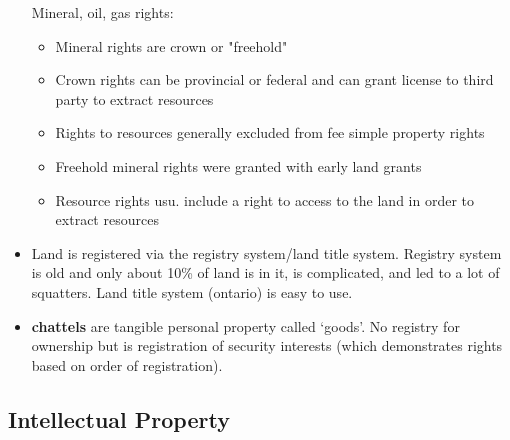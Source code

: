 \documentclass[10pt]{article}
\begin{document}
\begin{itemize}
		Mineral, oil, gas rights:
		\begin{itemize}
			\item Mineral rights are crown or "freehold"
			\item Crown rights can be provincial or federal and can grant license to third party to extract resources
			\item Rights to resources generally excluded from fee simple property rights
			\item Freehold mineral rights were granted with early land grants
			\item Resource rights usu. include a right to access to the land in order to extract resources
		\end{itemize}
	\item 	Land is registered via the registry system/land title system. Registry system is old and only about 10\% of land is in it, is complicated, and led to a lot of squatters. Land title system (ontario) is easy to use.
	\item \textbf{chattels}  are tangible personal property called `goods'. No registry for ownership but is registration of security interests (which demonstrates rights based on order of registration).

\end{itemize}

\subsection{Intellectual Property}
\end{document}
